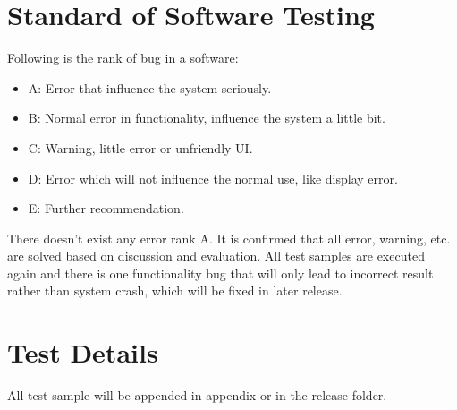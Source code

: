 \documentclass{article}
\begin{document}
	\section{Standard of Software Testing}
		Following is the rank of bug in a software:
		\begin{itemize}
		\item A: Error that influence the system seriously.
		\item B: Normal error in functionality, influence the system a little bit.
		\item C: Warning, little error or unfriendly UI.
		\item D: Error which will not influence the normal use, like display error.
		\item E: Further recommendation.
		\end{itemize}
		There doesn't exist any error rank A. It is confirmed that all error, warning, etc. are solved based on discussion and evaluation. All test samples are executed again and there is one functionality bug that will only lead to incorrect result rather than system crash, which will be fixed in later release.
	\newpage
	\section{Test Details}
	All test sample will be appended in appendix or in the release folder.
\end{document}

